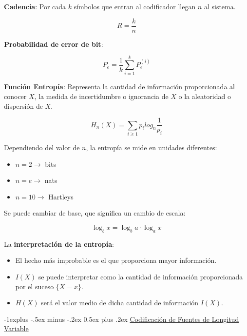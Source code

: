 \documentclass[10pt,landscape]{article}
\makeatletter
\renewcommand{\subsection}{\@startsection{subsection}{2}{0mm}%
                                {-1explus -.5ex minus -.2ex}%
                                {0.5ex plus .2ex}%
                                {\normalfont\normalsize\bfseries}}
\makeatother
\begin{document}
\begin{multicols}{3}
\textbf{Cadencia}: Por cada $k$ símbolos que entran al codificador llegan $n$ al sistema.

	\begin{equation*}
		R = \frac{k}{n}
	\end{equation*}

\textbf{Probabilidad de error de bit}:

	\begin{equation*}
		P_e = \frac{1}{k} \sum_{i = 1}^k P_e^{(i)}
	\end{equation*}

\textbf{Función Entropía}: Representa la cantidad de información proporcionada al conocer $X$, la medida de incertidumbre o ignorancia de $X$ o la aleatoridad o dispersión de $X$.

	\begin{equation*}
		H_n(X) = \sum_{i \geq 1} p_i log_n \frac{1}{p_i}
	\end{equation*}

Dependiendo del valor de $n$, la entropía se mide en unidades diferentes:

\begin{itemize}
	\item $n = 2 \rightarrow$ bits
	\item $n = e \rightarrow$ nats
	\item $n = 10 \rightarrow$ Hartleys 
\end{itemize}

Se puede cambiar de base, que significa un cambio de escala:

\begin{equation*}
	\log_b x = \log_b a \cdot \log_a x
\end{equation*}

La \textbf{interpretación de la entropía}:

\begin{itemize}
	\item El hecho más improbable es el que proporciona mayor información.
	\item $I(X)$ se puede interpretar como la cantidad de información proporcionada por el suceso $\{ X = x \}$.
	\item $H(X)$ será el valor medio de dicha cantidad de información $I(X)$.
\end{itemize}

\subsection{\underline{Codificación de Fuentes de Longitud Variable}}


\end{multicols}
\end{document}
